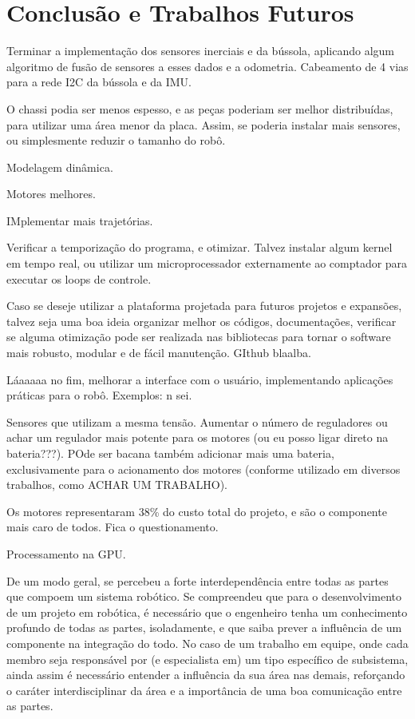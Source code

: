 \section{Conclusão e Trabalhos Futuros}
\label{sec:conclusao}

Terminar a implementação dos sensores inerciais e da bússola, aplicando algum algoritmo de fusão de sensores a esses dados e a odometria. Cabeamento de 4 vias para a rede I2C da bússola e da IMU.

O chassi podia ser menos espesso, e as peças poderiam ser melhor distribuídas, para utilizar uma área menor da placa. Assim, se poderia instalar mais sensores, ou simplesmente reduzir o tamanho do robô.

Modelagem dinâmica.

Motores melhores.

IMplementar mais trajetórias.

Verificar a temporização do programa, e otimizar. Talvez instalar algum kernel em tempo real, ou utilizar um microprocessador externamente ao comptador para executar os loops de controle.

Caso se deseje utilizar a plataforma projetada para futuros projetos e expansões, talvez seja uma boa ideia organizar melhor os códigos, documentações, verificar se alguma otimização pode ser realizada nas bibliotecas para tornar o software mais robusto, modular e de fácil manutenção. GIthub blaalba.

Láaaaaa no fim, melhorar a interface com o usuário, implementando aplicações práticas para o robô. Exemplos: n sei.

Sensores que utilizam a mesma tensão. Aumentar o número de reguladores ou achar um regulador mais potente para os motores (ou eu posso ligar direto na bateria???). POde ser bacana também adicionar mais uma bateria, exclusivamente para o acionamento dos motores (conforme utilizado em diversos trabalhos, como ACHAR UM TRABALHO).

Os motores representaram 38\% do custo total do projeto, e são o componente mais caro de todos. Fica o questionamento.

Processamento na GPU.


De um modo geral, se percebeu a forte interdependência entre todas as partes que compoem um sistema robótico. Se compreendeu que para o desenvolvimento de um projeto em robótica, é necessário que o engenheiro tenha um conhecimento profundo de todas as partes, isoladamente, e que saiba prever a influência de um componente na integração do todo. No caso de um trabalho em equipe, onde cada membro seja responsável por (e especialista em) um tipo específico de subsistema, ainda assim é necessário entender a influência da sua área nas demais, reforçando o caráter interdisciplinar da área e a importância de uma boa comunicação entre as partes.

